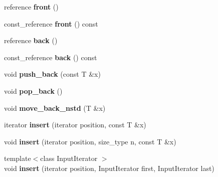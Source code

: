 \begin{DoxyCompactItemize}
\item 
\hypertarget{classyasli_1_1vector_afe5465b11ee91e953169c26417db9299}{}reference {\bfseries front} ()\label{classyasli_1_1vector_afe5465b11ee91e953169c26417db9299}

\item 
\hypertarget{classyasli_1_1vector_a781453266501ca193ba88edb5d65b65b}{}const\+\_\+reference {\bfseries front} () const \label{classyasli_1_1vector_a781453266501ca193ba88edb5d65b65b}

\item 
\hypertarget{classyasli_1_1vector_ab10628e522b9683da24f7ea28cdc59b7}{}reference {\bfseries back} ()\label{classyasli_1_1vector_ab10628e522b9683da24f7ea28cdc59b7}

\item 
\hypertarget{classyasli_1_1vector_a0eec22baaab13ca1be6e580629d2f672}{}const\+\_\+reference {\bfseries back} () const \label{classyasli_1_1vector_a0eec22baaab13ca1be6e580629d2f672}

\item 
\hypertarget{classyasli_1_1vector_aab95e250b0a39eaaf295d5c0a050ac95}{}void {\bfseries push\+\_\+back} (const T \&x)\label{classyasli_1_1vector_aab95e250b0a39eaaf295d5c0a050ac95}

\item 
\hypertarget{classyasli_1_1vector_ada771f25bd2085f7c7cb3601cdf3d076}{}void {\bfseries pop\+\_\+back} ()\label{classyasli_1_1vector_ada771f25bd2085f7c7cb3601cdf3d076}

\item 
\hypertarget{classyasli_1_1vector_a4cc2eab36abb44befd78444f248062c9}{}void {\bfseries move\+\_\+back\+\_\+nstd} (T \&x)\label{classyasli_1_1vector_a4cc2eab36abb44befd78444f248062c9}

\item 
\hypertarget{classyasli_1_1vector_a3746b555c2c3ce25d7bdd3e140e3942a}{}iterator {\bfseries insert} (iterator position, const T \&x)\label{classyasli_1_1vector_a3746b555c2c3ce25d7bdd3e140e3942a}

\item 
\hypertarget{classyasli_1_1vector_ab1a471cd10062e26af1bf04662dfdaa0}{}void {\bfseries insert} (iterator position, size\+\_\+type n, const T \&x)\label{classyasli_1_1vector_ab1a471cd10062e26af1bf04662dfdaa0}

\item 
\hypertarget{classyasli_1_1vector_a3b150b20a2a138001f3fcc971b004c7d}{}{\footnotesize template$<$class Input\+Iterator $>$ }\\void {\bfseries insert} (iterator position, Input\+Iterator first, Input\+Iterator last)\label{classyasli_1_1vector_a3b150b20a2a138001f3fcc971b004c7d}


\end{DoxyCompactItemize}
